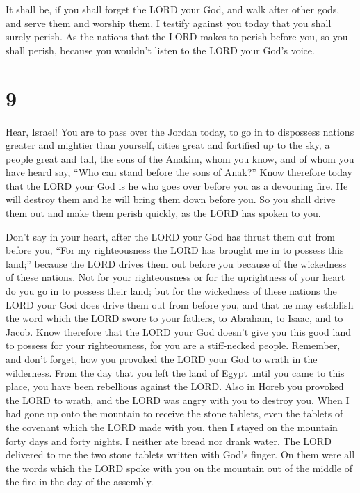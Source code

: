  It shall be, if you shall forget the LORD your God, and
walk after other gods, and serve them and worship them, I testify
against you today that you shall surely perish.  As the
nations that the LORD makes to perish before you, so you shall perish,
because you wouldn't listen to the LORD your God's voice.

\hypertarget{section-8}{%
\section{9}\label{section-8}}

 Hear, Israel! You are to pass over the Jordan today, to
go in to dispossess nations greater and mightier than yourself, cities
great and fortified up to the sky,  a people great and
tall, the sons of the Anakim, whom you know, and of whom you have heard
say, ``Who can stand before the sons of Anak?''  Know
therefore today that the LORD your God is he who goes over before you as
a devouring fire. He will destroy them and he will bring them down
before you. So you shall drive them out and make them perish quickly, as
the LORD has spoken to you.

 Don't say in your heart, after the LORD your God has
thrust them out from before you, ``For my righteousness the LORD has
brought me in to possess this land;'' because the LORD drives them out
before you because of the wickedness of these nations. 
Not for your righteousness or for the uprightness of your heart do you
go in to possess their land; but for the wickedness of these nations the
LORD your God does drive them out from before you, and that he may
establish the word which the LORD swore to your fathers, to Abraham, to
Isaac, and to Jacob.  Know therefore that the LORD your
God doesn't give you this good land to possess for your righteousness,
for you are a stiff-necked people.  Remember, and don't
forget, how you provoked the LORD your God to wrath in the wilderness.
From the day that you left the land of Egypt until you came to this
place, you have been rebellious against the LORD.  Also in
Horeb you provoked the LORD to wrath, and the LORD was angry with you to
destroy you.  When I had gone up onto the mountain to
receive the stone tablets, even the tablets of the covenant which the
LORD made with you, then I stayed on the mountain forty days and forty
nights. I neither ate bread nor drank water.  The LORD
delivered to me the two stone tablets written with God's finger. On them
were all the words which the LORD spoke with you on the mountain out of
the middle of the fire in the day of the assembly.


